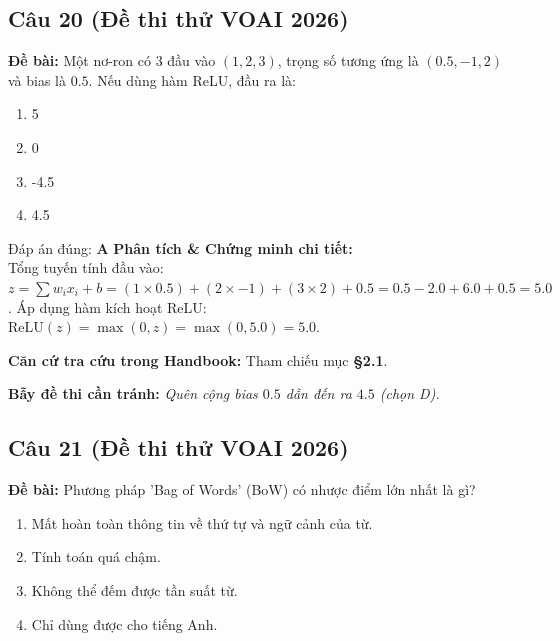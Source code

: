 \documentclass[10pt,a4paper]{article}
\begin{document}
\subsection*{Câu 20 (Đề thi thử VOAI 2026)}
\textbf{Đề bài:} Một nơ-ron có 3 đầu vào $(1, 2, 3)$, trọng số tương ứng là $(0.5, -1, 2)$ và bias là $0.5$. Nếu dùng hàm ReLU, đầu ra là:

\begin{enumerate}[label=\textbf{\Alph*.}]
    \item 5
    \item 0
    \item -4.5
    \item 4.5
\end{enumerate}

\begin{solbox}{Đáp án đúng: \textbf{A}}
\textbf{Phân tích \& Chứng minh chi tiết:} \\
Tổng tuyến tính đầu vào: $z = \sum w_i x_i + b = (1 \times 0.5) + (2 \times -1) + (3 \times 2) + 0.5 = 0.5 - 2.0 + 6.0 + 0.5 = 5.0$. Áp dụng hàm kích hoạt ReLU: $\text{ReLU}(z) = \max(0, z) = \max(0, 5.0) = 5.0$.

\vspace{0.4em}
\textbf{Căn cứ tra cứu trong Handbook:} Tham chiếu mục \textbf{§2.1}.

\vspace{0.4em}
\textbf{Bẫy đề thi cần tránh:} \textit{Quên cộng bias $0.5$ dẫn đến ra $4.5$ (chọn D).}
\end{solbox}
\vspace{0.5em}


\subsection*{Câu 21 (Đề thi thử VOAI 2026)}
\textbf{Đề bài:} Phương pháp 'Bag of Words' (BoW) có nhược điểm lớn nhất là gì?

\begin{enumerate}[label=\textbf{\Alph*.}]
    \item Mất hoàn toàn thông tin về thứ tự và ngữ cảnh của từ.
    \item Tính toán quá chậm.
    \item Không thể đếm được tần suất từ.
    \item Chỉ dùng được cho tiếng Anh.
\end{enumerate}
\end{document}
